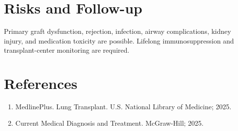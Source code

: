 \section*{Risks and Follow-up}
Primary graft dysfunction, rejection, infection, airway complications, kidney injury, and medication toxicity are possible. Lifelong immunosuppression and transplant-center monitoring are required.
\section*{References}
\begin{enumerate}\item MedlinePlus. Lung Transplant. U.S. National Library of Medicine; 2025.\item Current Medical Diagnosis and Treatment. McGraw-Hill; 2025.\end{enumerate}
\clearpage
